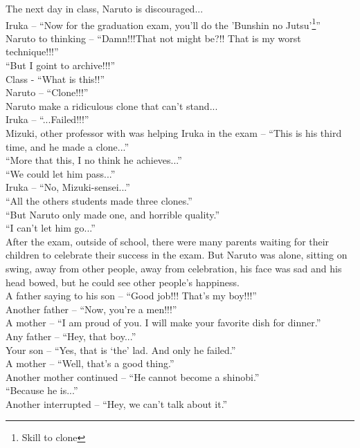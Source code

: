 \documentclass[
10pt,				%
openright,			%
oneside,			%
a5paper,			%
brazil,				%
french,				%
english,			%
sumario=tradicional
]{abntex2}
\begin{document}
The next day in class, Naruto is discouraged...\\
Iruka -- \enquote{Now for the graduation exam, you'll do the 'Bunshin no Jutsu'\footnote{Skill to clone}}\\
Naruto to thinking -- \enquote{Damn!!!That not might be?!! That is my worst technique!!!}\\
\enquote{But I goint to archive!!!}\\
Class - \enquote{What is this!!}\\
Naruto -- \enquote{Clone!!!}\\
Naruto make a ridiculous clone that can't stand...\\
Iruka -- \enquote{...Failed!!!}\\
Mizuki, other professor with was helping Iruka in the exam -- \enquote{This is his third time, and he made a clone...}\\
\enquote{More that this, I no think he achieves...}\\
\enquote{We could let him pass...}\\
Iruka -- \enquote{No, Mizuki-sensei...}\\
\enquote{All the others students made three clones.}\\
\enquote{But Naruto only made one, and horrible quality.}\\
\enquote{I can't let him go...}\\

After the exam, outside of school, there were many parents waiting for their children to celebrate their success in the exam. But Naruto was alone, sitting on swing, away from other people, away from celebration, his face was sad and his head bowed, but he could see other people's happiness.\\
A father saying to his son --  \enquote{Good job!!! That's my boy!!!}\\
Another father -- \enquote{Now, you're a men!!!}\\
A mother -- \enquote{I am proud of you. I will make your favorite dish  for dinner.}\\
Any father -- \enquote{Hey, that boy...}\\
Your son -- \enquote{Yes, that is \enquote{the} lad. And only he failed.}\\
A mother -- \enquote{Well, that's a good thing.}\\
Another mother continued -- \enquote{He cannot become a shinobi.}\\
\enquote{Because he is...}\\
Another interrupted -- \enquote{Hey, we can't talk about it.}\\
\end{document}
